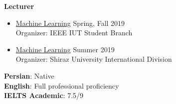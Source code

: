 \divider

\textbf{Lecturer} \\
\vspace{2mm}
\begin{itemize}
\item \href{https://msamsami.ece.iut.ac.ir/content/machine-learning-1}{Machine Learning} \hfill  Spring, Fall 2019 \\
Organizer: IEEE IUT Student Branch
\smallskip
\item \href{https://msamsami.ece.iut.ac.ir/content/machine-learning-1}{Machine Learning} \hfill  Summer 2019 \\
Organizer: Shiraz University International Division
\end{itemize}


\vspace{4mm}
\textbf{Persian}: Native\\
\smallskip
\textbf{English}: Full professional proficiency\\
\smallskip
\textbf{IELTS Academic}: 7.5/9





